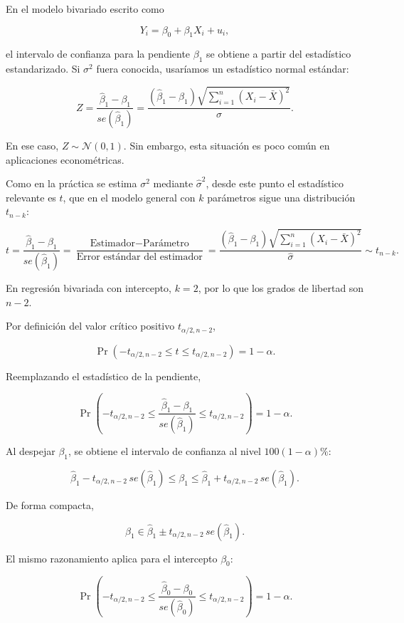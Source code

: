 \documentclass[11pt,a4paper]{article}
\begin{document}
En el modelo bivariado escrito como

\[
Y_i=\beta_0+\beta_1X_i+u_i,
\]

el intervalo de confianza para la pendiente \(\beta_1\) se obtiene a partir del estadístico estandarizado. Si \(\sigma^2\) fuera conocida, usaríamos un estadístico normal estándar:

\[
Z=\frac{\hat{\beta}_1-\beta_1}{se(\hat{\beta}_1)}
=\frac{(\hat{\beta}_1-\beta_1)\sqrt{\sum_{i=1}^{n}(X_i-\bar{X})^2}}{\sigma}.
\]

En ese caso, \(Z\sim\mathcal{N}(0,1)\). Sin embargo, esta situación es poco común en aplicaciones econométricas.

Como en la práctica se estima \(\sigma^2\) mediante \(\hat{\sigma}^2\), desde este punto el estadístico relevante es \(t\), que en el modelo general con \(k\) parámetros sigue una distribución \(t_{n-k}\):

\[
t=\frac{\hat{\beta}_1-\beta_1}{se(\hat{\beta}_1)}
=\frac{\text{Estimador}-\text{Parámetro}}{\text{Error estándar del estimador}}
=\frac{(\hat{\beta}_1-\beta_1)\sqrt{\sum_{i=1}^{n}(X_i-\bar{X})^2}}{\hat{\sigma}}
\sim t_{n-k}.
\]

En regresión bivariada con intercepto, \(k=2\), por lo que los grados de libertad son \(n-2\).

Por definición del valor crítico positivo \(t_{\alpha/2,n-2}\),

\[
\Pr\left(-t_{\alpha/2,n-2}\leq t\leq t_{\alpha/2,n-2}\right)=1-\alpha.
\]

Reemplazando el estadístico de la pendiente,

\[
\Pr\left(-t_{\alpha/2,n-2}\leq
\frac{\hat{\beta}_1-\beta_1}{se(\hat{\beta}_1)}
\leq t_{\alpha/2,n-2}\right)=1-\alpha.
\]

Al despejar \(\beta_1\), se obtiene el intervalo de confianza al nivel \(100(1-\alpha)\%\):

\begin{resultado}
\[
\boxed{
\hat{\beta}_1-t_{\alpha/2,n-2}\,se(\hat{\beta}_1)
\leq \beta_1 \leq
\hat{\beta}_1+t_{\alpha/2,n-2}\,se(\hat{\beta}_1)
}.
\]
\end{resultado}

De forma compacta,

\[
\boxed{\beta_1\in \hat{\beta}_1\pm t_{\alpha/2,n-2}\,se(\hat{\beta}_1)}.
\]

El mismo razonamiento aplica para el intercepto \(\beta_0\):

\[
\Pr\left(-t_{\alpha/2,n-2}\leq
\frac{\hat{\beta}_0-\beta_0}{se(\hat{\beta}_0)}
\leq t_{\alpha/2,n-2}\right)=1-\alpha.
\]
\end{document}
